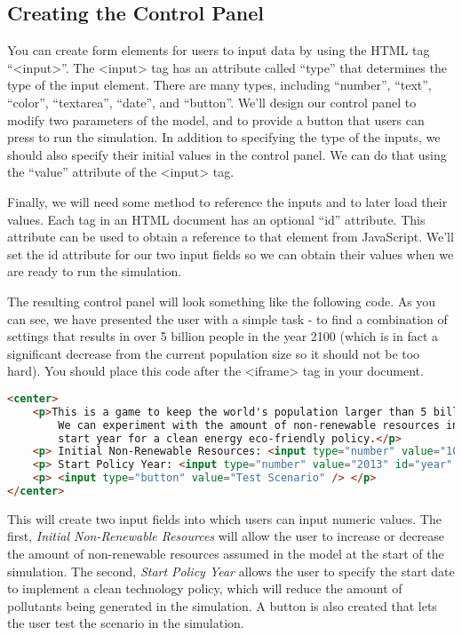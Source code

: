 \documentclass[]{memoir}
\begin{document}
\subsection{Creating the Control Panel}

You can create form elements for users to input data by using the HTML
tag ``\textless{}input\textgreater{}''. The
\textless{}input\textgreater{} tag has an attribute called ``type'' that
determines the type of the input element. There are many types,
including ``number'', ``text'', ``color'', ``textarea'', ``date'', and
``button''. We'll design our control panel to modify two parameters of
the model, and to provide a button that users can press to run the
simulation. In addition to specifying the type of the inputs, we should
also specify their initial values in the control panel. We can do that
using the ``value'' attribute of the \textless{}input\textgreater{} tag.

Finally, we will need some method to reference the inputs and to later
load their values. Each tag in an HTML document has an optional ``id''
attribute. This attribute can be used to obtain a reference to that
element from JavaScript. We'll set the id attribute for our two input
fields so we can obtain their values when we are ready to run the
simulation.

The resulting control panel will look something like the following code.
As you can see, we have presented the user with a simple task - to find
a combination of settings that results in over 5 billion people in the
year 2100 (which is in fact a significant decrease from the current
population size so it should not be too hard). You should place this
code after the \textless{}iframe\textgreater{} tag in your document.

\begin{lstlisting}[language=HTML]
<center>
    <p>This is a game to keep the world's population larger than 5 billion in the year 2100.
        We can experiment with the amount of non-renewable resources in the world and the
        start year for a clean energy eco-friendly policy.</p>
    <p> Initial Non-Renewable Resources: <input type="number" value="100" id="resources" /> % </p>
    <p> Start Policy Year: <input type="number" value="2013" id="year" /> </p>
    <p> <input type="button" value="Test Scenario" /> </p>
</center>
\end{lstlisting}

This will create two input fields into which users can input numeric
values. The first, \emph{Initial Non-Renewable Resources} will allow the
user to increase or decrease the amount of non-renewable resources
assumed in the model at the start of the simulation. The second,
\emph{Start Policy Year} allows the user to specify the start date to
implement a clean technology policy, which will reduce the amount of
pollutants being generated in the simulation. A button is also created
that lets the user test the scenario in the simulation.
\end{document}
